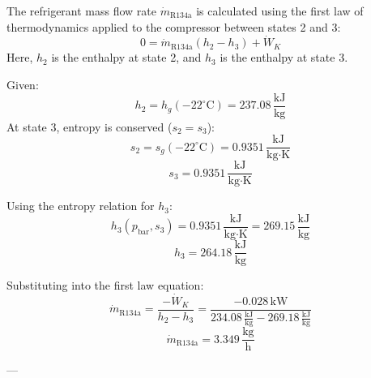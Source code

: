 The refrigerant mass flow rate \( \dot{m}_{\text{R134a}} \) is calculated using the first law of thermodynamics applied to the compressor between states 2 and 3:  
\[
0 = \dot{m}_{\text{R134a}} (h_2 - h_3) + \dot{W}_K
\]  
Here, \( h_2 \) is the enthalpy at state 2, and \( h_3 \) is the enthalpy at state 3.  

Given:  
\[
h_2 = h_g(-22^\circ\text{C}) = 237.08 \, \frac{\text{kJ}}{\text{kg}}
\]  
At state 3, entropy is conserved (\( s_2 = s_3 \)):  
\[
s_2 = s_g(-22^\circ\text{C}) = 0.9351 \, \frac{\text{kJ}}{\text{kg·K}}
\]  
\[
s_3 = 0.9351 \, \frac{\text{kJ}}{\text{kg·K}}
\]  

Using the entropy relation for \( h_3 \):  
\[
h_3(p_{\text{bar}}, s_3) = 0.9351 \, \frac{\text{kJ}}{\text{kg·K}} = 269.15 \, \frac{\text{kJ}}{\text{kg}}
\]  
\[
h_3 = 264.18 \, \frac{\text{kJ}}{\text{kg}}
\]  

Substituting into the first law equation:  
\[
\dot{m}_{\text{R134a}} = \frac{-\dot{W}_K}{h_2 - h_3} = \frac{-0.028 \, \text{kW}}{234.08 \, \frac{\text{kJ}}{\text{kg}} - 269.18 \, \frac{\text{kJ}}{\text{kg}}}
\]  
\[
\dot{m}_{\text{R134a}} = 3.349 \, \frac{\text{kg}}{\text{h}}
\]  

---